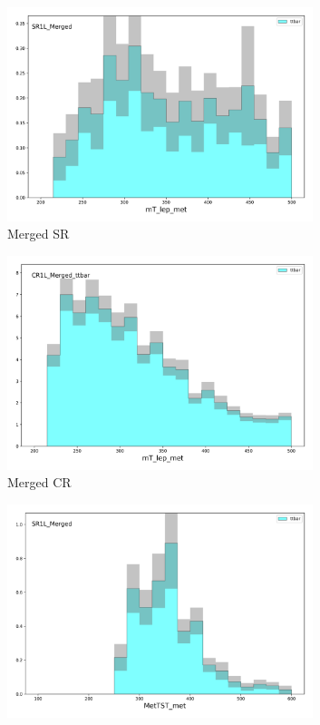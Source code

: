 \begin{figure}[htbp]
    \begin{subfigure}{0.49\textwidth}
    \includegraphics[width = 0.98\textwidth]{Figures/4/CRSR/SR1L_Merged/mT_lep_met.png}
    \caption{Merged SR \mtlepmet}
    \end{subfigure}
    \begin{subfigure}{0.49\textwidth}
    \includegraphics[width = 0.98\textwidth]{Figures/4/CRSR/CR1L_Merged_ttbar/mT_lep_met.png}
    \caption{Merged CR \mtlepmet}
    \end{subfigure}
    \begin{subfigure}{0.49\textwidth}
    \includegraphics[width = 0.98\textwidth]{Figures/4/CRSR/SR1L_Merged/MetTST_met.png}

\end{subfigure}
\end{figure}
